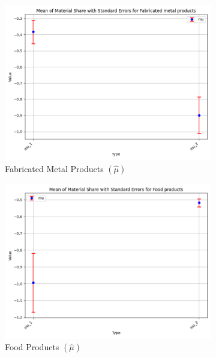 \documentclass{article}
\begin{document}
\begin{figure}[ht!]
    \begin{subfigure}[t]{0.32\textwidth}
        \centering
        \includegraphics[width=\textwidth]{figure/empirical_stat_normal_kmshare_ciiu_mu_with_error_bars_Fabricated metal products.png}
        \caption{Fabricated Metal Products $(\hat\mu)$}
    \end{subfigure}
    \begin{subfigure}[t]{0.32\textwidth}
        \centering
        \includegraphics[width=\textwidth]{figure/empirical_stat_normal_kmshare_ciiu_mu_with_error_bars_Food products.png}
        \caption{Food Products $(\hat\mu)$}
    \end{subfigure}
    \begin{subfigure}[t]{0.32\textwidth}

\end{subfigure}
\end{figure}
\end{document}
